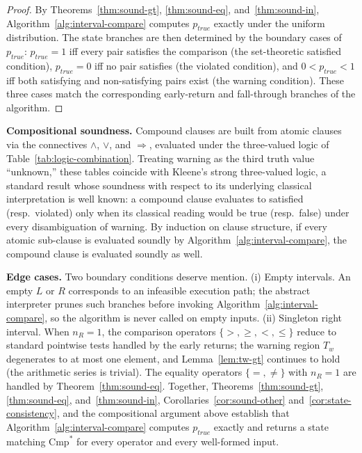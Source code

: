 \documentclass[pdflatex,sn-basic]{sn-jnl}%
\theoremstyle{thmstyleone}%
\theoremstyle{thmstyletwo}%
\theoremstyle{thmstylethree}%
\begin{document}
\begin{proof}
By Theorems~\ref{thm:sound-gt}, \ref{thm:sound-eq}, and~\ref{thm:sound-in}, Algorithm~\ref{alg:interval-compare} computes $p_{\mathit{true}}$ exactly under the uniform distribution. The state branches are then determined by the boundary cases of $p_{\mathit{true}}$: $p_{\mathit{true}} = 1$ iff every pair satisfies the comparison (the set-theoretic satisfied condition), $p_{\mathit{true}} = 0$ iff no pair satisfies (the violated condition), and $0 < p_{\mathit{true}} < 1$ iff both satisfying and non-satisfying pairs exist (the warning condition). These three cases match the corresponding early-return and fall-through branches of the algorithm.
\end{proof}

\smallskip
\noindent\textbf{Compositional soundness.}
Compound clauses are built from atomic clauses via the connectives $\wedge$, $\vee$, and $\Rightarrow$, evaluated under the three-valued logic of Table~\ref{tab:logic-combination}. Treating warning as the third truth value ``unknown,'' these tables coincide with Kleene's strong three-valued logic, a standard result whose soundness with respect to its underlying classical interpretation is well known: a compound clause evaluates to satisfied (resp.\ violated) only when its classical reading would be true (resp.\ false) under every disambiguation of warning. By induction on clause structure, if every atomic sub-clause is evaluated soundly by Algorithm~\ref{alg:interval-compare}, the compound clause is evaluated soundly as well.

\smallskip
\noindent\textbf{Edge cases.}
Two boundary conditions deserve mention. (i) Empty intervals. An empty $L$ or $R$ corresponds to an infeasible execution path; the abstract interpreter prunes such branches before invoking Algorithm~\ref{alg:interval-compare}, so the algorithm is never called on empty inputs. (ii) Singleton right interval. When $n_R = 1$, the comparison operators $\{>, \geq, <, \leq\}$ reduce to standard pointwise tests handled by the early returns; the warning region $T_w$ degenerates to at most one element, and Lemma~\ref{lem:tw-gt} continues to hold (the arithmetic series is trivial). The equality operators $\{=, \neq\}$ with $n_R = 1$ are handled by Theorem~\ref{thm:sound-eq}. Together, Theorems~\ref{thm:sound-gt}, \ref{thm:sound-eq}, and~\ref{thm:sound-in}, Corollaries~\ref{cor:sound-other} and~\ref{cor:state-consistency}, and the compositional argument above establish that Algorithm~\ref{alg:interval-compare} computes $p_{\mathit{true}}$ exactly and returns a state matching $\text{Cmp}^*$ for every operator and every well-formed input.
\end{document}
